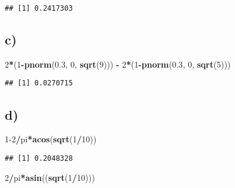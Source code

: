 \documentclass[
]{article}
\newenvironment{Shaded}{\begin{snugshade}}{\end{snugshade}}
\newcommand{\DecValTok}[1]{\textcolor[rgb]{0.00,0.00,0.81}{#1}}
\newcommand{\FloatTok}[1]{\textcolor[rgb]{0.00,0.00,0.81}{#1}}
\newcommand{\FunctionTok}[1]{\textcolor[rgb]{0.13,0.29,0.53}{\textbf{#1}}}
\newcommand{\NormalTok}[1]{#1}
\newcommand{\SpecialCharTok}[1]{\textcolor[rgb]{0.81,0.36,0.00}{\textbf{#1}}}
\begin{document}
\begin{verbatim}
## [1] 0.2417303
\end{verbatim}

\hypertarget{c-1}{%
\subsection{c)}\label{c-1}}

\begin{Shaded}
\begin{Highlighting}[]
\DecValTok{2}\SpecialCharTok{*}\NormalTok{(}\DecValTok{1}\SpecialCharTok{{-}}\FunctionTok{pnorm}\NormalTok{(}\FloatTok{0.3}\NormalTok{, }\DecValTok{0}\NormalTok{, }\FunctionTok{sqrt}\NormalTok{(}\DecValTok{9}\NormalTok{))) }\SpecialCharTok{{-}} \DecValTok{2}\SpecialCharTok{*}\NormalTok{(}\DecValTok{1}\SpecialCharTok{{-}}\FunctionTok{pnorm}\NormalTok{(}\FloatTok{0.3}\NormalTok{, }\DecValTok{0}\NormalTok{, }\FunctionTok{sqrt}\NormalTok{(}\DecValTok{5}\NormalTok{)))}
\end{Highlighting}
\end{Shaded}

\begin{verbatim}
## [1] 0.0270715
\end{verbatim}

\hypertarget{d-1}{%
\subsection{d)}\label{d-1}}

\begin{Shaded}
\begin{Highlighting}[]
\DecValTok{1{-}2}\SpecialCharTok{/}\NormalTok{pi}\SpecialCharTok{*}\FunctionTok{acos}\NormalTok{(}\FunctionTok{sqrt}\NormalTok{(}\DecValTok{1}\SpecialCharTok{/}\DecValTok{10}\NormalTok{))}
\end{Highlighting}
\end{Shaded}

\begin{verbatim}
## [1] 0.2048328
\end{verbatim}

\begin{Shaded}
\begin{Highlighting}[]
\DecValTok{2}\SpecialCharTok{/}\NormalTok{pi}\SpecialCharTok{*}\FunctionTok{asin}\NormalTok{((}\FunctionTok{sqrt}\NormalTok{(}\DecValTok{1}\SpecialCharTok{/}\DecValTok{10}\NormalTok{)))}
\end{Highlighting}
\end{Shaded}
\end{document}
